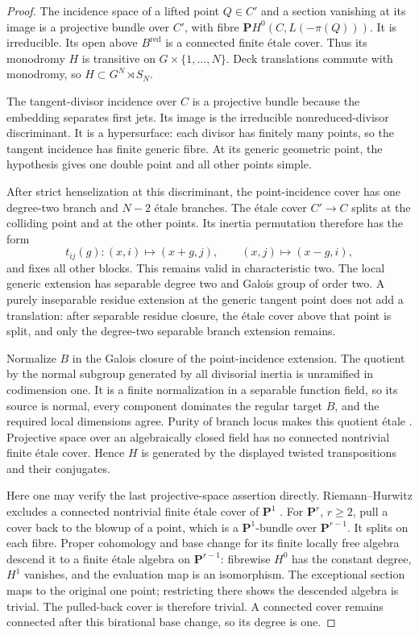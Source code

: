 \documentclass[11pt]{article}
\begin{document}
\begin{proof}
The incidence space of a lifted point $Q\in C'$ and a section vanishing at its image is a projective bundle over $C'$, with fibre $\mathbf P H^0(C,L(-\pi(Q)))$. It is irreducible. Its open above $B^{\mathrm{red}}$ is a connected finite \'etale cover. Thus its monodromy $H$ is transitive on $G\times\{1,\ldots,N\}$. Deck translations commute with monodromy, so $H\subset G^N\rtimes S_N$.

The tangent-divisor incidence over $C$ is a projective bundle because the embedding separates first jets. Its image is the irreducible nonreduced-divisor discriminant. It is a hypersurface: each divisor has finitely many points, so the tangent incidence has finite generic fibre. At its generic geometric point, the hypothesis gives one double point and all other points simple.

After strict henselization at this discriminant, the point-incidence cover has one degree-two branch and $N-2$ \'etale branches. The \'etale cover $C'\to C$ splits at the colliding point and at the other points. Its inertia permutation therefore has the form
\[
 t_{ij}(g):(x,i)\longmapsto(x+g,j),\qquad
 (x,j)\longmapsto(x-g,i),
\]
and fixes all other blocks. This remains valid in characteristic two. The local generic extension has separable degree two and Galois group of order two. A purely inseparable residue extension at the generic tangent point does not add a translation: after separable residue closure, the \'etale cover above that point is split, and only the degree-two separable branch extension remains.

Normalize $B$ in the Galois closure of the point-incidence extension. The quotient by the normal subgroup generated by all divisorial inertia is unramified in codimension one. It is a finite normalization in a separable function field, so its source is normal, every component dominates the regular target $B$, and the required local dimensions agree. Purity of branch locus makes this quotient \'etale \citep[Lemma~58.21.4]{StacksPurity}. Projective space over an algebraically closed field has no connected nontrivial finite \'etale cover. Hence $H$ is generated by the displayed twisted transpositions and their conjugates.

Here one may verify the last projective-space assertion directly. Riemann--Hurwitz excludes a connected nontrivial finite \'etale cover of $\mathbf P^1$ \citep[Section~53.12, Lemma~53.12.2]{StacksRH}. For $\mathbf P^r$, $r\ge2$, pull a cover back to the blowup of a point, which is a $\mathbf P^1$-bundle over $\mathbf P^{r-1}$. It splits on each fibre. Proper cohomology and base change \citep[Lemma~30.22.1]{StacksBaseChange} for its finite locally free algebra descend it to a finite \'etale algebra on $\mathbf P^{r-1}$: fibrewise $H^0$ has the constant degree, $H^1$ vanishes, and the evaluation map is an isomorphism. The exceptional section maps to the original one point; restricting there shows the descended algebra is trivial. The pulled-back cover is therefore trivial. A connected cover remains connected after this birational base change, so its degree is one.


\end{proof}
\end{document}
